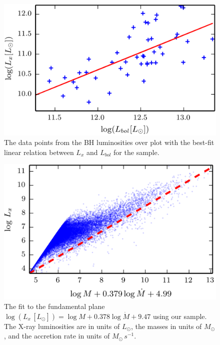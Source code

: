 \begin{figure}
\centering{}\includegraphics[clip]{Figures/elvis_template} \protect\caption{\label{fig:Elvis_template}The data points from the BH luminosities
over plot with the best-fit linear relation between $L_{x}$ and $L_{bol}$
for the sample.}
\end{figure}
\begin{figure}
\begin{centering}
\includegraphics{Figures/fp_fit}
\par\end{centering}

\protect\caption{\label{fig:q_nr_hist}The fit to the fundamental plane
$\log\left(L_x\,[L_\odot]\right) = \log M+0.378\log\dot{{M}}+9.47$ using our sample. The
X-ray luminosities are in units of $L_\odot$, the masses in units of $M_\odot$, and the
accretion rate in units of $M_{\odot}\,s^{-1}$.}
\end{figure}


